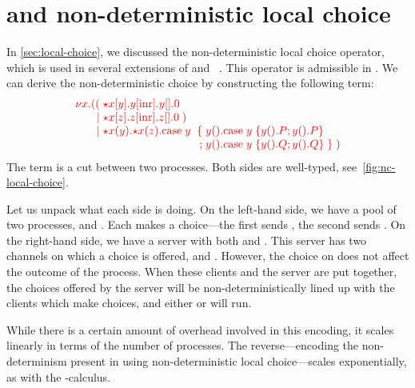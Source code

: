 \section{\nodcap and non-deterministic local choice}\label{sec:nc-local-choice}
In \cref{sec:local-choice}, we discussed the non-deterministic local choice
operator, which is used in several extensions of \piDILL and
\cp~\parencite{atkey2016,caires2014,caires2017}.
This operator is admissible in \nodcap.
We can derive the non-deterministic choice  by constructing the
following term:
\[
  \arraycolsep=0pt
  \tm{
  \begin{array}{lrlrl}
    \nu x.&((  & \; \ncCnt{x}{y}{\cpInr{y}{\cpHalt{y}}} \\
          &\mid& \; \ncCnt{x}{z}{\cpInr{z}{\cpHalt{z}}} \; )\\
          &\mid& \; \ncSrv{x}{y}{\ncSrv{x}{z}{}}\text{case}\;y\;
          &\;\{& \; \cpWait{y}{\cpCase{y}{\cpWait{y}{P}}{\cpWait{y}{P}}}\\
          &&& ;& \; \cpWait{y}{\cpCase{y}{\cpWait{y}{Q}}{\cpWait{y}{Q}}}\;\}\;)
  \end{array}
  }
\]
The term is a cut between two processes.
Both sides are well-typed, see~\cref{fig:nc-local-choice}.

Let us unpack what each side is doing. 
On the left-hand side, we have a pool of two processes,
 and .
Each makes a choice---the first sends , the second sends .
On the right-hand side, we have a server with both  and .
This server has two channels on which a choice is offered,  and
. However, the choice on  does not affect the outcome of the
process.
When these clients and the server are put together, the choices offered by the
server will be non-deterministically lined up with the clients which make
choices, and either  or  will run.

While there is a certain amount of overhead involved in this encoding, it scales
linearly in terms of the number of processes.
The reverse---encoding the non-determinism present in \nodcap using
non-deterministic local choice---scales exponentially, as with the \textpi-calculus.

